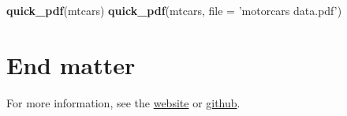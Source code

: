 \documentclass[]{article}
\newenvironment{Shaded}{\begin{snugshade}}{\end{snugshade}}
\newcommand{\DataTypeTok}[1]{\textcolor[rgb]{0.13,0.29,0.53}{#1}}
\newcommand{\KeywordTok}[1]{\textcolor[rgb]{0.13,0.29,0.53}{\textbf{#1}}}
\newcommand{\NormalTok}[1]{#1}
\newcommand{\StringTok}[1]{\textcolor[rgb]{0.31,0.60,0.02}{#1}}
\begin{document}
\begin{Shaded}
\begin{Highlighting}[]
\KeywordTok{quick_pdf}\NormalTok{(mtcars) }
\KeywordTok{quick_pdf}\NormalTok{(mtcars, }\DataTypeTok{file =} \StringTok{'motorcars data.pdf'}\NormalTok{)}
\end{Highlighting}
\end{Shaded}

\FloatBarrier

\hypertarget{end-matter}{%
\section{End matter}\label{end-matter}}

For more information, see the
\href{https://hughjonesd.github.io/huxtable}{website} or
\href{https://github.com/hughjonesd/huxtable}{github}.
\end{document}
